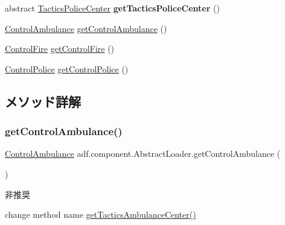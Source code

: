 \begin{DoxyCompactItemize}
\item 
\hypertarget{classadf_1_1component_1_1AbstractLoader_a37df58a82bd68958ef32a8db70e4d2dc}{}\label{classadf_1_1component_1_1AbstractLoader_a37df58a82bd68958ef32a8db70e4d2dc} 
abstract \hyperlink{classadf_1_1component_1_1tactics_1_1center_1_1TacticsPoliceCenter}{Tactics\+Police\+Center} {\bfseries get\+Tactics\+Police\+Center} ()
\item 
\hyperlink{classadf_1_1component_1_1control_1_1ControlAmbulance}{Control\+Ambulance} \hyperlink{classadf_1_1component_1_1AbstractLoader_a2044c317869b16349d4fdbf7d5d50dcd}{get\+Control\+Ambulance} ()
\item 
\hyperlink{classadf_1_1component_1_1control_1_1ControlFire}{Control\+Fire} \hyperlink{classadf_1_1component_1_1AbstractLoader_a66e4649d775d291dda3e5b977596bccf}{get\+Control\+Fire} ()
\item 
\hyperlink{classadf_1_1component_1_1control_1_1ControlPolice}{Control\+Police} \hyperlink{classadf_1_1component_1_1AbstractLoader_a2917adfedf677a3af006521e64996a42}{get\+Control\+Police} ()
\end{DoxyCompactItemize}


\subsection{メソッド詳解}
\hypertarget{classadf_1_1component_1_1AbstractLoader_a2044c317869b16349d4fdbf7d5d50dcd}{}\label{classadf_1_1component_1_1AbstractLoader_a2044c317869b16349d4fdbf7d5d50dcd} 
\subsubsection{\texorpdfstring{get\+Control\+Ambulance()}{getControlAmbulance()}}
{\footnotesize\ttfamily \hyperlink{classadf_1_1component_1_1control_1_1ControlAmbulance}{Control\+Ambulance} adf.\+component.\+Abstract\+Loader.\+get\+Control\+Ambulance (\begin{DoxyParamCaption}{ }\end{DoxyParamCaption})}

\begin{DoxyRefDesc}{非推奨}
\item[\hyperlink{deprecated__deprecated000006}{非推奨}]change method name \hyperlink{}{get\+Tactics\+Ambulance\+Center()} \end{DoxyRefDesc}
\hypertarget{classadf_1_1component_1_1AbstractLoader_a66e4649d775d291dda3e5b977596bccf}{}\label{classadf_1_1component_1_1AbstractLoader_a66e4649d775d291dda3e5b977596bccf} 
